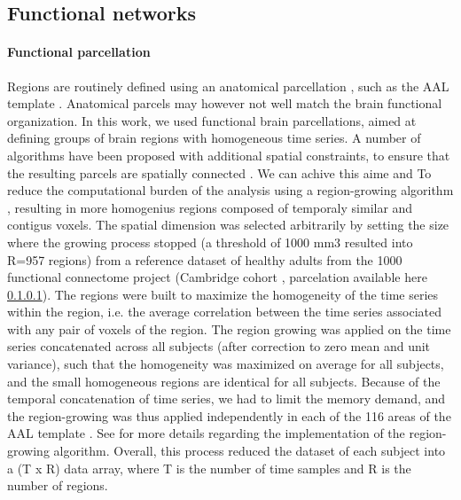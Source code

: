 \documentclass[authoryear]{elsarticle}
\begin{document}
\subsection{Functional networks}

\paragraph{Functional parcellation}
Regions are routinely defined using an anatomical parcellation \citep{He2009}, such as the AAL template \citep{Tzourio-Mazoyer2002}. Anatomical parcels may however not well match the brain functional organization. In this work, we used functional brain parcellations, aimed at defining groups of brain regions with homogeneous time series. A number of algorithms have been proposed with additional spatial constraints, to ensure that the resulting parcels are spatially connected \citep{Lu2003,Thirion2006,Craddock2012}. We can achive this aime and To reduce the computational burden of the analysis using a region-growing algorithm \cite{Bellec2006},  resulting in more homogenius regions composed of temporaly similar and contigus voxels. The spatial dimension was selected arbitrarily by setting the size where the growing process stopped (a threshold of 1000 mm3 resulted into R=957 regions) from a reference dataset of healthy adults from the 1000 functional connectome project (Cambridge cohort \citep{Biswal2010}, parcelation available here \ref{}). The regions were built to maximize the homogeneity of the time series within the region, i.e. the average correlation between the time series associated with any pair of voxels of the region. The region growing was applied on the time series concatenated across all subjects (after correction to zero mean and unit variance), such that the homogeneity was maximized on average for all subjects, and the small homogeneous regions are identical for all subjects. Because of the temporal concatenation of time series, we had to limit the memory demand, and the region-growing was thus applied independently in each of the 116 areas of the AAL template \citep{Tzourio-Mazoyer2002}. See \cite{Bellec2006} for more details regarding the implementation of the region-growing algorithm. Overall, this process reduced the dataset of each subject into a (T x R) data array, where T is the number of time samples and R is the number of regions.
\end{document}
